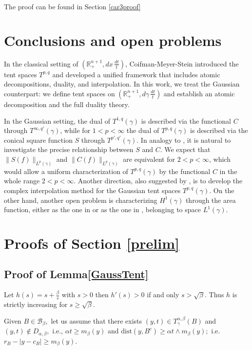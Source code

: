 \documentclass[leqno,11pt]{amsart}
\theoremstyle{plain}
\theoremstyle{remark}
\begin{document}
{The proof can be found in Section \ref{car3proof}
\section{Conclusions and open problems}\label{conclusiones}
In the classical setting of $(\mathbb{R}^{n+1}_+, dx\,\tfrac{dt}{t})$, Coifman-Meyer-Stein \cite{cms} introduced the tent spaces $T^{p,q}$ and developed a unified framework that includes atomic decompositions, duality, and interpolation. 
In this work, we treat the Gaussian counterpart: we define tent spaces on $(\mathbb{R}^{n+1}_+, d\gamma \,\tfrac{dt}{t})$ and establish an atomic decomposition and the full duality theory.

In the Gaussian setting, the dual of $T^{1,q}(\gamma)$ is described via the functional $C$ through $T^{\infty,q'}(\gamma)$, while for $1<p<\infty$ the dual of $T^{p,q}(\gamma)$ is described via the conical square function $S$ through $T^{p',q'}(\gamma)$. 
In analogy to \cite{cms}, it is natural to investigate the precise relationship between $S$ and $C$. 
We expect that $\|S(f)\|_{L^{p}(\gamma)}$ and $\|C(f)\|_{L^{p}(\gamma)}$ are equivalent for $2<p<\infty$, which would allow a uniform characterization of $T^{p,q}(\gamma)$ by the functional $C$ in the whole range $2<p<\infty$. 
Another direction, also suggested by \cite{cms}, is to develop the complex interpolation method for the Gaussian tent spaces $T^{p,q}(\gamma)$. On the other hand, another open problem is characterizing $H^1(\gamma)$ through the area function, either as the one in \cite{FSU} or as the one in \cite{MNP2}, belonging to space $L^1(\gamma).$
 


\section{Proofs of Section \ref{prelim}}\label{demostraciones}




\subsection{Proof of Lemma\ref{GaussTent}}\label{LASTENT}

Let $h(s)=s+\frac{\beta}{s}$ with $s>0$ then $h'(s)>0$ if and only  $s>\sqrt{\beta}.$ Thus $h$ is strictly increasing for $s\ge \sqrt{\beta}.$

Given $B\in \mathscr{B}_\beta,$ let us assume that there exists $(y,t)\in T^{\alpha, \beta}_\gamma(B)$ and $(y,t)\notin D_{\alpha, \beta},$  i.e., $\alpha t\ge m_\beta (y)$ and $\text{dist}(y, B^c)\ge \alpha t\wedge m_\beta (y); $
i.e. $r_B-|y-c_B|\ge m_\beta (y).$

}
\end{document}
